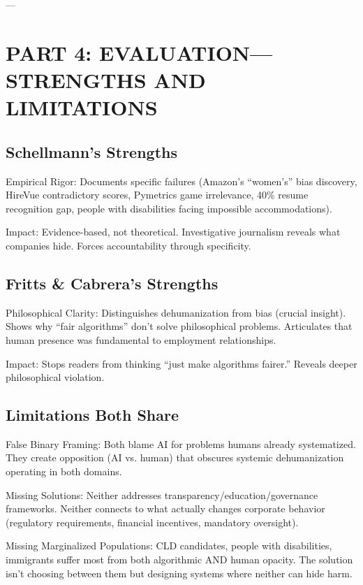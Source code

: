 \documentclass[12pt,letterpaper]{article}
\begin{document}
---

\section{PART 4: EVALUATION---STRENGTHS AND LIMITATIONS}

\subsection{Schellmann's Strengths}

\begin{keyfindings}
Empirical Rigor: Documents specific failures (Amazon's ``women's'' bias discovery, HireVue contradictory scores, Pymetrics game irrelevance, 40\% resume recognition gap, people with disabilities facing impossible accommodations).

Impact: Evidence-based, not theoretical. Investigative journalism reveals what companies hide. Forces accountability through specificity.
\end{keyfindings}

\subsection{Fritts \& Cabrera's Strengths}

\begin{keyfindings}
Philosophical Clarity: Distinguishes dehumanization from bias (crucial insight). Shows why ``fair algorithms'' don't solve philosophical problems. Articulates that human presence was fundamental to employment relationships.

Impact: Stops readers from thinking ``just make algorithms fairer.'' Reveals deeper philosophical violation.
\end{keyfindings}

\subsection{Limitations Both Share}

\begin{keyfindings}
False Binary Framing: Both blame AI for problems humans already systematized. They create opposition (AI vs. human) that obscures systemic dehumanization operating in both domains.

Missing Solutions: Neither addresses transparency/education/governance frameworks. Neither connects to what actually changes corporate behavior (regulatory requirements, financial incentives, mandatory oversight).

Missing Marginalized Populations: CLD candidates, people with disabilities, immigrants suffer most from both algorithmic AND human opacity. The solution isn't choosing between them but designing systems where neither can hide harm.
\end{keyfindings}
\end{document}
